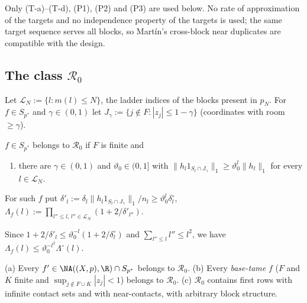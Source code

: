 Only (T-a)--(T-d), (P1), (P2) and (P3) are used below.  No rate of
approximation of the targets and no independence property of the targets
is used; the same target sequence serves all blocks, so Mart\'in's
cross-block near duplicates are compatible with the design.

\subsection{The class $\mathcal R_0$}
Let $\mathcal L_N:=\{l:m(l)\le N\}$, the ladder indices of the blocks
present in $p_N$.  For $f\in S_{p^*}$ and $\gamma\in(0,1)$ let
$J_\gamma:=\{j\notin F:|z_j|\le1-\gamma\}$ (coordinates with room
$\ge\gamma$).

\begin{definition}\label{def:R0}
$f\in S_{p^*}$ belongs to $\mathcal R_0$ if $F$ is finite and
\begin{enumerate}
\item[(SR)] there are $\gamma\in(0,1)$ and $\vartheta_0\in(0,1]$ with
$\|h_l1_{S_l\cap J_\gamma}\|_1\ge\vartheta_0^l\|h_l\|_1$ for every
$l\in\mathcal L_N$.
\end{enumerate}
For such $f$ put $\delta'_l:=\delta_l\|h_l1_{S_l\cap J_\gamma}\|_1/n_l\ge
\vartheta_0^l\delta^\circ_l$, $\Lambda_f(l):=\prod_{l''\le l,\,l''\in
\mathcal L_N}(1+2/\delta'_{l''})$.
\end{definition}

Since $1+2/\delta'_l\le\vartheta_0^{-l}(1+2/\delta^\circ_l)$ and
$\sum_{l''\le l}l''\le l^2$, we have $\Lambda_f(l)\le\vartheta_0^{-l^2}
\Lambda^\circ(l)$.

\begin{lemma}\label{lem:R0}
\textup{(a)} Every $f'\in\NA((X,p),\R)\cap S_{p^*}$ belongs to
$\mathcal R_0$.  \textup{(b)} Every \emph{base-tame} $f$ \textup{(}$F$ and
$K$ finite and $\sup_{j\notin F\cup K}|z_j|<1$\textup{)} belongs to
$\mathcal R_0$.  \textup{(c)} $\mathcal R_0$ contains first rows with
infinite contact sets and with near-contacts, with arbitrary block
structure.
\end{lemma}


